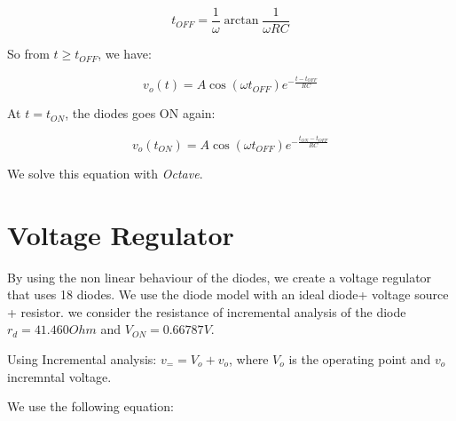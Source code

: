 \begin{equation}
  t_{OFF} = \frac{1}{\omega}\arctan\frac{1}{\omega RC}
\end{equation}

So from $t \geq t_{OFF}$, we have:

\begin{equation}
  v_o(t) = A\cos(\omega t_{OFF}) e^{-\frac{t-t_{OFF}}{RC}}
\end{equation}

At $t = t_{ON}$, the diodes goes ON again:

\begin{equation}
  v_o(t_{ON}) = A\cos(\omega t_{OFF}) e^{-\frac{t_{ON}-t_{OFF}}{RC}}
\end{equation}

We solve this equation with \textit{Octave}.


\section{Voltage Regulator}

By using the non linear behaviour of the diodes, we create a voltage regulator that uses 18 diodes.
We use the diode model with an ideal diode+ voltage source + resistor. we consider the resistance of incremental analysis of the diode
$r_d = 41.460 Ohm$ and $V_{ON} = 0.66787 V$.

Using Incremental analysis: $v_= = V_o + v_o$, where $V_o$ is the operating point and $v_o$ incremntal voltage.

We use the following equation:

\begin{equation}

\end{equation}


